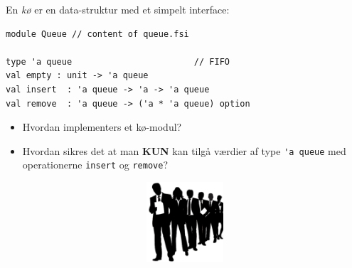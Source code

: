\documentclass[rgb]{beamer}
\begin{document}
\begin{frame}[fragile]
\begin{footnotesize}


  \vspace{1ex}

\begin{minipage}[b]{0.80\textwidth}

  En \emph{kø} er en data-struktur med et simpelt interface:

  \vspace{1ex}

\begin{lstlisting}[numbers=none,frame=none,mathescape]
module Queue // content of queue.fsi

type 'a queue                        // FIFO
val empty : unit -> 'a queue
val insert  : 'a queue -> 'a -> 'a queue
val remove  : 'a queue -> ('a * 'a queue) option
\end{lstlisting}
  \vspace{1ex}
\begin{itemize}
\item Hvordan implementers et kø-modul?
\item Hvordan sikres det at man \textbf{KUN} kan tilgå værdier af type
  \lstinline{'a queue} med operationerne \lstinline{insert} og
  \lstinline{remove}?
\end{itemize}

\end{minipage} \hspace{-4mm}
\begin{minipage}[b]{0.16\textwidth}

  \includegraphics[width=1.4\textwidth,height=3cm]{../images/queue.png}

\end{minipage}

\end{footnotesize}
\end{frame}
\end{document}
